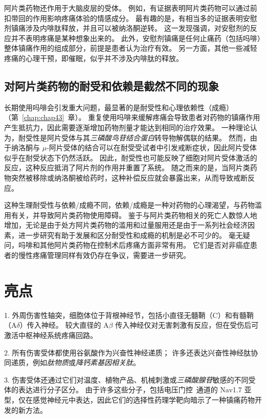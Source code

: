 阿片类药物还作用于大脑皮层的受体。
例如，有证据表明阿片类药物可以通过前扣带回的作用影响疼痛体验的情感成分。
最有趣的是，有相当多的证据表明安慰剂镇痛涉及内啡肽释放，并且可以被纳洛酮逆转。
这一发现强调，对安慰剂的反应并不表明疼痛是某种想象出来的。
此外，安慰剂镇痛是任何止痛药（包括吗啡）整体镇痛作用的组成部分，前提是患者认为治疗有效。
另一方面，其他一些减轻疼痛的心理干预，即催眠，似乎并不涉及内啡肽的释放。



\subsection{对阿片类药物的耐受和依赖是截然不同的现象}

长期使用吗啡会引发重大问题，最显著的是耐受性和心理依赖性（成瘾）（第~\ref{chap:chap43}~章）。
重复使用吗啡来缓解疼痛会导致患者对药物的镇痛作用产生抵抗力，因此需要逐渐增加药物剂量才能达到相同的治疗效果。
一种理论认为，耐受性是阿片受体与其\textit{三磷酸鸟苷结合蛋白}转导物解偶联的结果。
然而，由于纳洛酮与 $\mu$-阿片受体的结合可以在耐受受试者中引发戒断症状，因此阿片受体似乎在耐受状态下仍然活跃。
因此，耐受性也可能反映了细胞对阿片受体激活的反应，这种反应抵消了阿片剂的作用并重置了系统。
随之而来的是，当阿片类药物突然被移除或纳洛酮被给药时，这种补偿反应就会暴露出来，从而导致戒断反应。


这种生理耐受性与依赖/成瘾不同，依赖/成瘾是一种对药物的心理渴望，与药物滥用有关，并导致阿片类药物使用障碍。
鉴于与阿片类药物相关的死亡人数惊人地增加，无论是由于处方阿片类药物的滥用和过量服用还是由于一系列社会经济因素，进一步研究有助于发展和区分耐受性和成瘾的机制是必不可少的。
毫无疑问，吗啡和其他阿片类药物在控制术后疼痛方面非常有用。
它们是否对非癌症患者的慢性疼痛管理同样有效仍存在争议，需要进一步研究。



\section{亮点}

1. 外周伤害性轴突，细胞体位于背根神经节，包括小直径无髓鞘（C）和有髓鞘（A$\delta$）传入神经。
较大直径的 A$\beta$ 传入神经仅对无害刺激有反应，但在受伤后可激活中枢神经系统疼痛回路。 


2. 所有伤害受体都使用谷氨酸作为兴奋性神经递质； 许多还表达兴奋性神经肽协同递质，例如\textit{肽物质}或\textit{降钙素基因相关肽}。


3. 伤害受体还通过它们对温度、植物产品、机械刺激或\textit{三磷酸腺苷}敏感的不同受体的表达进行分子区分。
由于许多这些分子，包括电压门控~通道的 Nav1.7 亚型，仅在感觉神经元中表达，因此它们的选择性药理学靶向暗示了一种镇痛药物开发的新方法。



